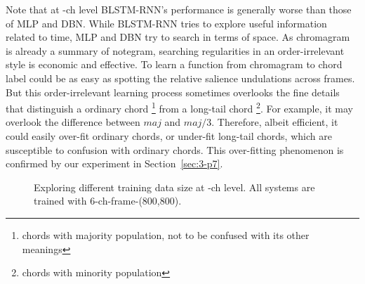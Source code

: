 
Note that at -ch level BLSTM-RNN's performance is generally worse than those of MLP and DBN. While BLSTM-RNN tries to explore useful information related to time, MLP and DBN try to search in terms of space. As chromagram is already a summary of notegram, searching regularities in an order-irrelevant style is economic and effective. To learn a function from chromagram to chord label could be as easy as spotting the relative salience undulations across frames. But this order-irrelevant learning process sometimes overlooks the fine details that distinguish a ordinary chord \footnote{chords with majority population, not to be confused with its other meanings} from a long-tail chord \footnote{chords with minority population}. For example, it may overlook the difference between $maj$ and $maj/3$. Therefore, albeit efficient, it could easily over-fit ordinary chords, or under-fit long-tail chords, which are susceptible to confusion with ordinary chords. This over-fitting phenomenon is confirmed by our experiment in Section~\ref{sec:3-p7}.

\label{sec:3-p5}

\begin{figure}[htb]
\centering
{}
\caption{Exploring different training data size at -ch level. All systems are trained with 6-ch-frame-(800,800).}
\label{fig:3-ch-data}
\end{figure}

